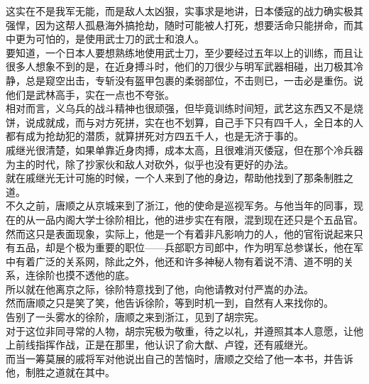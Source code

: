 \begin{multicols}{\theparacolNo}
这实在不是我军无能，而是敌人太凶狠，实事求是地讲，日本倭寇的战力确实极其强悍，因为这帮人孤悬海外搞抢劫，随时可能被人打死，想要活命只能拼命，而其中更为可怕的，是使用武士刀的武士和浪人。\\

要知道，一个日本人要想熟练地使用武士刀，至少要经过五年以上的训练，而且让很多人想象不到的是，在近身搏斗时，他们的刀很少与明军武器相碰，出刀极其冷静，总是窥空出击，专斩没有盔甲包裹的柔弱部位，不击则已，一击必是重伤。说他们是武林高手，实在一点也不夸张。\\

相对而言，义乌兵的战斗精神也很顽强，但毕竟训练时间短，武艺这东西又不是烧饼，说成就成，而与对方死拼，实在也不划算，自己手下只有四千人，全日本的人都有成为抢劫犯的潜质，就算拼死对方四五千人，也是无济于事的。\\

戚继光很清楚，如果单靠近身肉搏，成本太高，且很难消灭倭寇，但在那个冷兵器为主的时代，除了抄家伙和敌人对砍外，似乎也没有更好的办法。\\

就在戚继光无计可施的时候，一个人来到了他的身边，帮助他找到了那条制胜之道。\\

不久之前，唐顺之从京城来到了浙江，他的使命是巡视军务。与他当年的同事，现在的从一品内阁大学士徐阶相比，他的进步实在有限，混到现在还只是个五品官。\\

然而这只是表面现象，实际上，他是一个有着非凡影响力的人，他的官衔说起来只有五品，却是个极为重要的职位——兵部职方司郎中，作为明军总参谋长，他在军中有着广泛的关系网，除此之外，他还和许多神秘人物有着说不清、道不明的关系，连徐阶也摸不透他的底。\\

所以就在他离京之际，徐阶特意找到了他，向他请教对付严嵩的办法。\\

然而唐顺之只是笑了笑，他告诉徐阶，等到时机一到，自然有人来找你的。\\

告别了一头雾水的徐阶，唐顺之来到浙江，见到了胡宗宪。\\

对于这位非同寻常的人物，胡宗宪极为敬重，待之以礼，并遵照其本人意愿，让他上前线指挥作战，正是在那里，他认识了俞大猷、卢镗，还有戚继光。\\

而当一筹莫展的戚将军对他说出自己的苦恼时，唐顺之交给了他一本书，并告诉他，制胜之道就在其中。\\


\end{multicols}
